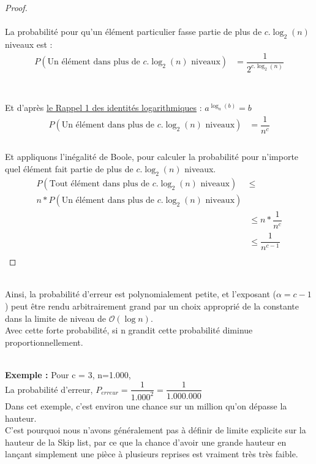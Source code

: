 \documentclass[hidelinks,a4paper,12pt]{article}
\begin{document}
\begin{proof}	
~\\~\\ 
La probabilité pour qu'un élément particulier fasse partie de plus de $c.\log_2(n)$ niveaux est : \\
\begin{equation} 
 \begin{aligned}
 		P(\text{Un élément dans plus de $c.\log_2(n)$ niveaux} ) & = \dfrac{1}{2^{c.\log_2 (n)}} \nonumber \\				
 \end{aligned}
\end{equation}
~\\~\\
Et d'après \hypertarget{depart5}{\hyperlink{Rappel1}{le Rappel 1 des identités logarithmiques}} :  $a^{\log_a(b)} = b$
\begin{equation} 
 \begin{aligned}
	P(\text{Un élément dans plus de $c.\log_2(n)$ niveaux} ) &= \dfrac{1}{n^c} \nonumber \\ 		
 \end{aligned} 		
\end{equation}	
~\\
Et appliquons l'inégalité de Boole, pour calculer la probabilité pour n'importe quel élément fait partie de plus de $c.\log_2(n)$ niveaux. 
\begin{equation} 
	\begin{aligned}
		P(\text{Tout élément dans plus de $c.\log_2(n)$ niveaux} ) &\le \\
		n * P(\text{Un élément dans plus de $c.\log_2(n)$ niveaux} ) \\
		& \le n * \dfrac{1}{n^c} \nonumber \\
		& \le \dfrac{1}{n^{c-1}}\nonumber \\	
	\end{aligned}
\end{equation}
\end{proof}
~\\
Ainsi, la probabilité d’erreur est polynomialement petite, et l’exposant ($\alpha = c-1$) peut être rendu arbitrairement grand par un choix approprié de la constante dans la limite de niveau de $\mathcal{O}(\log n)$. \cite{ArticleDemaine} \\Avec cette forte probabilité, si n grandit cette probabilité diminue proportionnellement. 

~\\
\textbf {Exemple : } Pour c = 3, n=1.000, \\
La probabilité d’erreur, $P_{erreur} = \dfrac{1}{1.000^2} = \dfrac{1}{1.000.000} $ \medskip \\ 
Dans cet exemple, c'est environ une chance sur un million qu'on dépasse la hauteur. \medskip \\
C’est pourquoi nous n’avons généralement pas à définir de limite explicite sur la hauteur de la Skip list, par ce que la chance d'avoir une grande hauteur en lançant simplement une pièce à plusieurs reprises est vraiment très très faible. 
 
\end{document}
